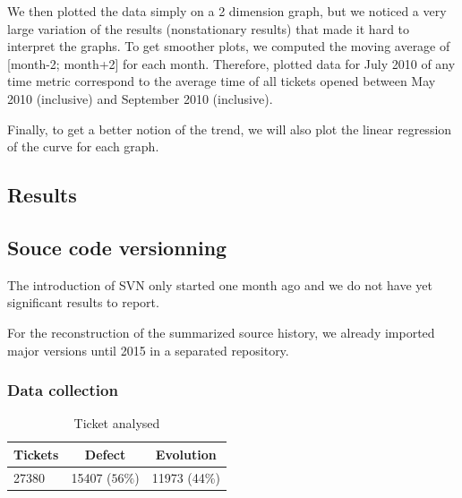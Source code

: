 \documentclass[10pt,conference]{IEEEtran}
\begin{document}
We then plotted the data simply on a 2 dimension graph, but we noticed a very large variation of the results (nonstationary results) that made it hard to interpret the graphs.
To get smoother plots, we computed the moving average of [month-2; month+2] for each month.
Therefore, plotted data for July 2010 of any time metric correspond to the average time of all tickets opened between May 2010 (inclusive) and September 2010 (inclusive).

Finally, to get a better notion of the trend, we will also plot the linear regression of the curve for each graph.

\subsection{Results}

\subsection{Souce code versionning}

The introduction of SVN only started one month ago and we do not have yet significant results to report. 

For the reconstruction of the summarized source history, we already imported major versions until 2015 in a separated repository. 

\subsubsection{Data collection}

\begin{table}[htbp]
  \begin{center}
    \caption{Ticket analysed}
    \label{tab:proportion}
    \begin{tabular}{| l | c |c|}
      \hline
      Tickets & Defect  & Evolution  \\
      \hline
      27380&15407 ($56\%$)&11973 (44\%)\\
      \hline 
    \end{tabular}
  \end{center}  
\end{table}
\end{document}

